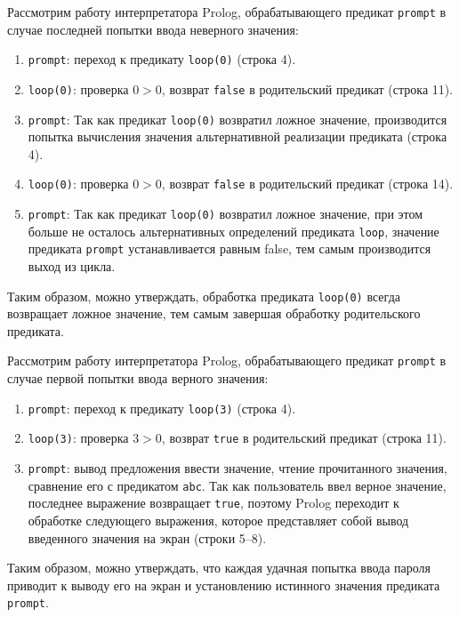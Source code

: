 Рассмотрим работу интерпретатора Prolog, обрабатывающего предикат \texttt{prompt} 
в случае последней попытки ввода неверного значения:

\begin{enumerate}
\item \texttt{prompt}:
  переход к предикату \texttt{loop(0)} (строка 4).
\item \texttt{loop(0)}:
  проверка \( 0 > 0 \), возврат \texttt{false} в родительский предикат (строка 11). 
\item \texttt{prompt}:
  Так как предикат \texttt{loop(0)} возвратил ложное значение, производится попытка
  вычисления значения альтернативной реализации предиката (строка 4). 
\item \texttt{loop(0)}:
  проверка \( 0 > 0 \), возврат \texttt{false} в родительский предикат (строка 14). 
\item \texttt{prompt}:
  Так как предикат \texttt{loop(0)} возвратил ложное значение, при этом больше не осталось
  альтернативных определений предиката \texttt{loop}, значение предиката \texttt{prompt}
  устанавливается равным false, тем самым производится выход из цикла. 
\end{enumerate}

Таким образом, можно утверждать, обработка предиката \texttt{loop(0)} всегда
возвращает ложное значение, тем самым завершая обработку родительского предиката.


Рассмотрим работу интерпретатора Prolog, обрабатывающего предикат \texttt{prompt} 
в случае первой попытки ввода верного значения:

\begin{enumerate}
\item \texttt{prompt}:
  переход к предикату \texttt{loop(3)} (строка 4). 
\item \texttt{loop(3)}:
  проверка \( 3 > 0 \), возврат \texttt{true} в родительский предикат (строка 11). 
\item \texttt{prompt}:
  вывод предложения ввести значение, чтение прочитанного значения,
  сравнение его с предикатом \texttt{abc}. 
  Так как пользователь ввел верное значение, последнее выражение возвращает
  \texttt{true}, поэтому Prolog переходит к обработке следующего выражения,
  которое представляет собой вывод введенного значения на экран (строки 5--8).
\end{enumerate}

Таким образом, можно утверждать, что каждая удачная попытка ввода пароля 
приводит к выводу его на экран и установлению истинного значения предиката \texttt{prompt}.


